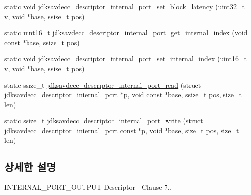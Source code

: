 \begin{DoxyCompactItemize}
\item 
static void \hyperlink{group__descriptor__internal__port_ga249a80a69ae2c9f45b3aa31b9d823ded}{jdksavdecc\+\_\+descriptor\+\_\+internal\+\_\+port\+\_\+set\+\_\+block\+\_\+latency} (\hyperlink{parse_8c_a6eb1e68cc391dd753bc8ce896dbb8315}{uint32\+\_\+t} v, void $\ast$base, ssize\+\_\+t pos)
\item 
static uint16\+\_\+t \hyperlink{group__descriptor__internal__port_ga0bfe9aa8ec57df686f5efdd7bc11ad9b}{jdksavdecc\+\_\+descriptor\+\_\+internal\+\_\+port\+\_\+get\+\_\+internal\+\_\+index} (void const $\ast$base, ssize\+\_\+t pos)
\item 
static void \hyperlink{group__descriptor__internal__port_ga0f7301c80e3e987780e9f10a08d81463}{jdksavdecc\+\_\+descriptor\+\_\+internal\+\_\+port\+\_\+set\+\_\+internal\+\_\+index} (uint16\+\_\+t v, void $\ast$base, ssize\+\_\+t pos)
\item 
static ssize\+\_\+t \hyperlink{group__descriptor__internal__port_ga36d743e0bc1ee224ca567ceddae4d35c}{jdksavdecc\+\_\+descriptor\+\_\+internal\+\_\+port\+\_\+read} (struct \hyperlink{structjdksavdecc__descriptor__internal__port}{jdksavdecc\+\_\+descriptor\+\_\+internal\+\_\+port} $\ast$p, void const $\ast$base, ssize\+\_\+t pos, size\+\_\+t len)
\item 
static ssize\+\_\+t \hyperlink{group__descriptor__internal__port_ga26cd492bc15c8f5aa1e126b573a69dba}{jdksavdecc\+\_\+descriptor\+\_\+internal\+\_\+port\+\_\+write} (struct \hyperlink{structjdksavdecc__descriptor__internal__port}{jdksavdecc\+\_\+descriptor\+\_\+internal\+\_\+port} const $\ast$p, void $\ast$base, size\+\_\+t pos, size\+\_\+t len)
\end{DoxyCompactItemize}


\subsection{상세한 설명}
I\+N\+T\+E\+R\+N\+A\+L\+\_\+\+P\+O\+R\+T\+\_\+\+O\+U\+T\+P\+UT Descriptor -\/ Clause 7.. 

